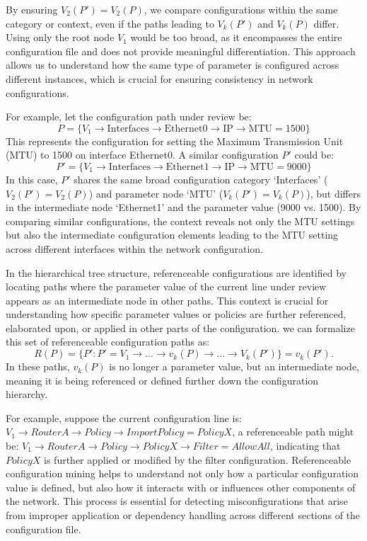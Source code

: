 By ensuring \(V_2(P') = V_2(P)\), we compare configurations within the same category or context, even if the paths leading to \( V_k(P') \) and \( V_k(P) \) differ. Using only the root node \( V_1 \) would be too broad, as it encompasses the entire configuration file and does not provide meaningful differentiation. This approach allows us to understand how the same type of parameter is configured across different instances, which is crucial for ensuring consistency in network configurations.



For example, let the configuration path under review be:
\[
P = \{ V_1 \rightarrow \text{Interfaces} \rightarrow \text{Ethernet0} \rightarrow \text{IP} \rightarrow \text{MTU} = 1500 \}
\]
This represents the configuration for setting the Maximum Transmission Unit (MTU) to 1500 on interface Ethernet0.
A similar configuration \( P' \) could be:
\[
P' = \{ V_1 \rightarrow \text{Interfaces} \rightarrow \text{Ethernet1} \rightarrow \text{IP} \rightarrow \text{MTU} = 9000 \}
\]
In this case, \( P' \) shares the same broad configuration category `Interfaces' (\( V_2(P') = V_2(P) \)) and parameter node `MTU' (\( V_k(P') = V_k(P) \)), but differs in the intermediate node `Ethernet1' and the parameter value (9000 vs. 1500). By comparing similar configurations, the context reveals not only the MTU settings but also the intermediate configuration elements leading to the MTU setting across different interfaces within the network configuration.


 In the hierarchical tree structure, referenceable configurations are identified by locating paths where the parameter value of the current line under review appears as an intermediate node in other paths. This context is crucial for understanding how specific parameter values or policies are further referenced, elaborated upon, or applied in other parts of the configuration. we can formalize this set of referenceable configuration paths as:
\[
R(P) = \{ P' : P' =  V_1 \rightarrow \dots \rightarrow v_k(P) \rightarrow \dots \rightarrow V_k(P') \} = v_k(P').
\]
In these paths, \( v_k(P) \) is no longer a parameter value, but an intermediate node, meaning it is being referenced or defined further down the configuration hierarchy.

For example, suppose the current configuration line is:
\(V_1 \rightarrow RouterA \rightarrow Policy \rightarrow ImportPolicy = PolicyX\), a referenceable path might be:
\(
V_1 \rightarrow  RouterA \rightarrow Policy \rightarrow PolicyX \rightarrow Filter = AllowAll
\),
indicating that \( PolicyX \) is further applied or modified by the filter configuration. Referenceable configuration mining helps to understand not only how a particular configuration value is defined, but also how it interacts with or influences other components of the network. This process is essential for detecting misconfigurations that arise from improper application or dependency handling across different sections of the configuration file.


